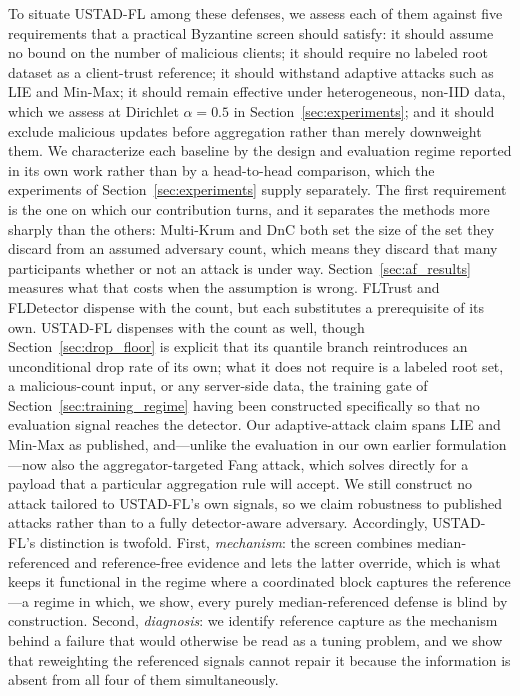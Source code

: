 \documentclass[journal]{IEEEtran}
\begin{document}
To situate USTAD-FL among these defenses, we assess each of them against five requirements that a practical Byzantine screen should satisfy: it should assume no bound on the number of malicious clients; it should require no labeled root dataset as a client-trust reference; it should withstand adaptive attacks such as LIE and Min-Max; it should remain effective under heterogeneous, non-IID data, which we assess at Dirichlet $\alpha=0.5$ in Section~\ref{sec:experiments}; and it should exclude malicious updates before aggregation rather than merely downweight them. We characterize each baseline by the design and evaluation regime reported in its own work rather than by a head-to-head comparison, which the experiments of Section~\ref{sec:experiments} supply separately. The first requirement is the one on which our contribution turns, and it separates the methods more sharply than the others: Multi-Krum and DnC both set the size of the set they discard from an assumed adversary count, which means they discard that many participants whether or not an attack is under way. Section~\ref{sec:af_results} measures what that costs when the assumption is wrong. FLTrust and FLDetector dispense with the count, but each substitutes a prerequisite of its own. USTAD-FL dispenses with the count as well, though Section~\ref{sec:drop_floor} is explicit that its quantile branch reintroduces an unconditional drop rate of its own; what it does not require is a labeled root set, a malicious-count input, or any server-side data, the training gate of Section~\ref{sec:training_regime} having been constructed specifically so that no evaluation signal reaches the detector. Our adaptive-attack claim spans LIE and Min-Max as published, and---unlike the evaluation in our own earlier formulation---now also the aggregator-targeted Fang attack, which solves directly for a payload that a particular aggregation rule will accept. We still construct no attack tailored to USTAD-FL's own signals, so we claim robustness to published attacks rather than to a fully detector-aware adversary. Accordingly, USTAD-FL's distinction is twofold. First, \emph{mechanism}: the screen combines median-referenced and reference-free evidence and lets the latter override, which is what keeps it functional in the regime where a coordinated block captures the reference---a regime in which, we show, every purely median-referenced defense is blind by construction. Second, \emph{diagnosis}: we identify reference capture as the mechanism behind a failure that would otherwise be read as a tuning problem, and we show that reweighting the referenced signals cannot repair it because the information is absent from all four of them simultaneously.
\end{document}
